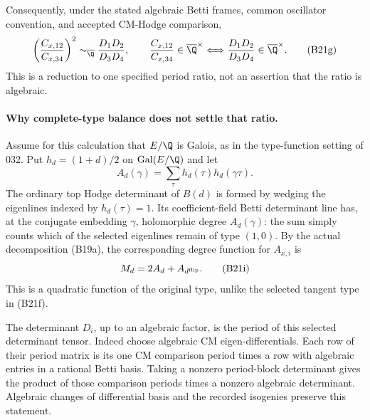 Consequently, under the stated algebraic Betti frames, common
oscillator convention, and accepted CM-Hodge comparison,
\[
 \left(\frac{C_{x,12}}{C_{x,34}}\right)^2
       \sim_{\overline\Q}\frac{D_1D_2}{D_3D_4},
 \qquad
 \frac{C_{x,12}}{C_{x,34}}\in\overline\Q^\times
 \Longleftrightarrow
 \frac{D_1D_2}{D_3D_4}\in\overline\Q^\times.
 \tag{B21g}
\]
This is a reduction to one specified period ratio, not an
assertion that the ratio is algebraic.

\paragraph{Why complete-type balance does not settle that ratio.}
Assume for this calculation that $E/\Q$ is Galois, as in the
type-function setting of 032.  Put $h_d=(1+d)/2$ on
$\operatorname{Gal}(E/\Q)$ and let
\[
 A_d(\gamma)=\sum_\tau h_d(\tau)h_d(\gamma\tau).
 \tag{B21h}
\]
The ordinary top Hodge determinant of $B(d)$ is formed by
wedging the eigenlines indexed by $h_d(\tau)=1$.  Its
coefficient-field Betti determinant line has, at the conjugate
embedding $\gamma$, holomorphic degree $A_d(\gamma)$:
the sum simply counts which of the selected eigenlines remain
of type $(1,0)$.  By the actual decomposition (B19a), the
corresponding degree function for $A_{x,i}$ is
\[
                         M_d=2A_d+A_{d^{\rm flip}}.
 \tag{B21i}
\]
This is a quadratic function of the original type, unlike the
selected tangent type in (B21f).

The determinant $D_i$, up to an algebraic factor, is the
period of this selected determinant tensor.  Indeed choose
algebraic CM eigen-differentials.  Each row of their period
matrix is its one CM comparison period times a row with
algebraic entries in a rational Betti basis.  Taking a
nonzero period-block determinant gives the product of those
comparison periods times a nonzero algebraic determinant.
Algebraic changes of differential basis and the recorded
isogenies preserve this statement.

